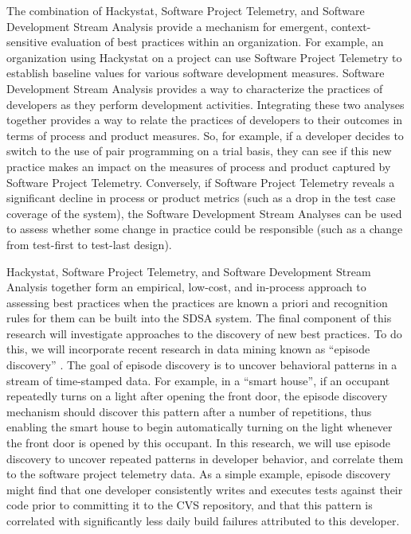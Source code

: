 The combination of Hackystat, Software Project Telemetry, and Software
Development Stream Analysis provide a mechanism for emergent,
context-sensitive evaluation of best practices within an organization.  For
example, an organization using Hackystat on a project can use Software
Project Telemetry to establish baseline values for various software
development measures.  Software Development Stream Analysis provides a way
to characterize the practices of developers as they perform development
activities.  Integrating these two analyses together provides a way to
relate the practices of developers to their outcomes in terms of process
and product measures. So, for example, if a developer decides to switch to
the use of pair programming on a trial basis, they can see if this new
practice makes an impact on the measures of process and product captured by
Software Project Telemetry.  Conversely, if Software Project Telemetry
reveals a significant decline in process or product metrics (such as a drop
in the test case coverage of the system), the Software Development Stream
Analyses can be used to assess whether some change in practice could be
responsible (such as a change from test-first to test-last design).

Hackystat, Software Project Telemetry, and Software Development Stream
Analysis together form an empirical, low-cost, and in-process approach to
assessing best practices when the practices are known a priori and
recognition rules for them can be built into the SDSA system.  The final
component of this research will investigate approaches to the discovery of
new best practices.  To do this, we will incorporate recent research in data
mining known as ``episode discovery'' \cite{Heierman04,Mannila95,Agrawal95}.  The
goal of episode discovery is to uncover behavioral patterns in a stream of
time-stamped data.  For example, in a ``smart house'', if an occupant
repeatedly turns on a light after opening the front door, the episode
discovery mechanism should discover this pattern after a number of
repetitions, thus enabling the smart house to begin automatically turning
on the light whenever the front door is opened by this occupant.  In this
research, we will use episode discovery to uncover repeated patterns in
developer behavior, and correlate them to the software project telemetry
data.  As a simple example, episode discovery might find that one developer
consistently writes and executes tests against their code prior to
committing it to the CVS repository, and that this pattern is correlated
with significantly less daily build failures attributed to this developer.

